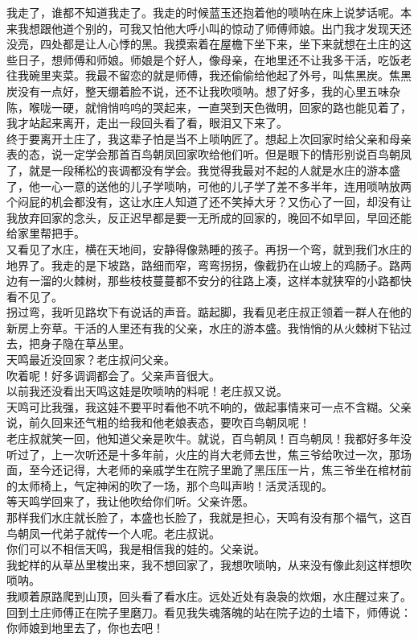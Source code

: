 我走了，谁都不知道我走了。我走的时候蓝玉还抱着他的唢呐在床上说梦话呢。本来我想跟他道个别的，可我又怕他大呼小叫的惊动了师傅师娘。出门我才发现天还没亮，四处都是让人心悸的黑。我摸索着在屋檐下坐下来，坐下来就想在土庄的这些日子，想师傅和师娘。师娘是个好人，像母亲，在地里还不让我多干活，吃饭老往我碗里夹菜。我最不留恋的就是师傅，我还偷偷给他起了外号，叫焦黑炭。焦黑炭没有一点好，整天绷着脸不说，还不让我吹唢呐。想了好多，我的心里五味杂陈，喉咙一硬，就悄悄呜呜的哭起来，一直哭到天色微明，回家的路也能见着了，我才站起来离开，走出一段回头看了看，眼泪又下来了。
\\

终于要离开土庄了，我这辈子怕是当不上唢呐匠了。想起上次回家时给父亲和母亲表的态，说一定学会那首百鸟朝凤回家吹给他们听。但是眼下的情形别说百鸟朝凤了，就是一段稀松的丧调都没有学会。我觉得我最对不起的人就是水庄的游本盛了，他一心一意的送他的儿子学唢呐，可他的儿子学了差不多半年，连用唢呐放两个闷屁的机会都没有，这让水庄人知道了还不笑掉大牙？又伤心了一回，却没有让我放弃回家的念头，反正迟早都是要一无所成的回家的，晚回不如早回，早回还能给家里帮把手。
\\

又看见了水庄，横在天地间，安静得像熟睡的孩子。再拐一个弯，就到我们水庄的地界了。我走的是下坡路，路细而窄，弯弯拐拐，像截扔在山坡上的鸡肠子。路两边有一溜的火棘树，那些枝枝蔓蔓都不安分的往路上凑，这样本就狭窄的小路都快看不见了。
\\

拐过弯，我听见路坎下有说话的声音。踮起脚，我看见老庄叔正领着一群人在他的新房上夯草。干活的人里还有我的父亲，水庄的游本盛。我悄悄的从火棘树下钻过去，把身子隐在草丛里。
\\

天鸣最近没回家？老庄叔问父亲。
\\

吹着呢！好多调调都会了。父亲声音很大。
\\

以前我还没看出天鸣这娃是吹唢呐的料呢！老庄叔又说。
\\

天鸣可比我强，我这娃不要平时看他不吭不响的，做起事情来可一点不含糊。父亲说，前久回来还气粗的给我和他老娘表态，要吹百鸟朝凤呢！
\\

老庄叔就笑一回，他知道父亲是吹牛。就说，百鸟朝凤！百鸟朝凤！我都好多年没听过了，上一次听还是十多年前，火庄的肖大老师去世，焦三爷给吹过一次，那场面，至今还记得，大老师的亲戚学生在院子里跪了黑压压一片，焦三爷坐在棺材前的太师椅上，气定神闲的吹了一场，那个鸟叫声哟！活灵活现的。
\\

等天鸣学回来了，我让他吹给你们听。父亲许愿。
\\

那样我们水庄就长脸了，本盛也长脸了，我就是担心，天鸣有没有那个福气，这百鸟朝凤一代弟子就传一个人呢。老庄叔说。
\\

你们可以不相信天鸣，我是相信我的娃的。父亲说。
\\

我蛇样的从草丛里梭出来，我不想回家了，我想吹唢呐，从来没有像此刻这样想吹唢呐。
\\

我顺着原路爬到山顶，回头看了看水庄。远处近处有袅袅的炊烟，水庄醒过来了。
\\

回到土庄师傅正在院子里磨刀。看见我失魂落魄的站在院子边的土墙下，师傅说：你师娘到地里去了，你也去吧！
\\
